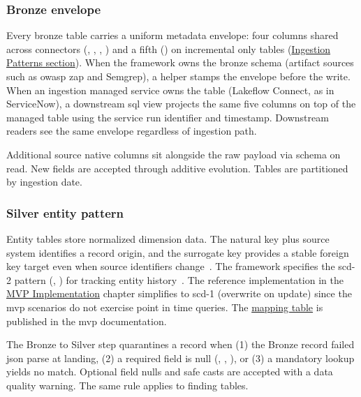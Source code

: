 \subsubsection{Bronze envelope}
\label{sec:bronze-pattern}

Every bronze table carries a uniform metadata envelope: four columns shared across connectors (, , , ) and a fifth () on incremental only tables (\hyperref[sec:ingestion-patterns]{Ingestion Patterns section}). When the framework owns the bronze schema (artifact sources such as \gls{owasp} \gls{zap} and Semgrep), a helper stamps the envelope before the write. When an ingestion managed service owns the table (Lakeflow Connect, as in ServiceNow), a downstream \gls{sql} view projects the same five columns on top of the managed table using the service run identifier and timestamp. Downstream readers see the same envelope regardless of ingestion path.

Additional source native columns sit alongside the raw payload via schema on read. New fields are accepted through additive evolution. Tables are partitioned by ingestion date.

\subsubsection{Silver entity pattern}

Entity tables store normalized dimension data. The natural key plus source system identifies a record origin, and the surrogate key provides a stable foreign key target even when source identifiers change~\parencite{Kimball2013}. The framework specifies the \gls{scd}-2 pattern (, ) for tracking entity history~\parencite{Kimball2013, Inmon2005}. The reference implementation in the \hyperref[ch:implementation]{MVP Implementation} chapter simplifies to \gls{scd}-1 (overwrite on update) since the \gls{mvp} scenarios do not exercise point in time queries. The \href{https://vkraus.github.io/appsec-mvp/platform/reference/canonical-mapping/\#silver-entity-mapping-requirements}{mapping table} is published in the \gls{mvp} documentation.

The Bronze to Silver step quarantines a record when (1) the Bronze record failed \gls{json} parse at landing, (2) a required field is null (, , ), or (3) a mandatory lookup yields no match. Optional field nulls and safe casts are accepted with a data quality warning. The same rule applies to finding tables.

